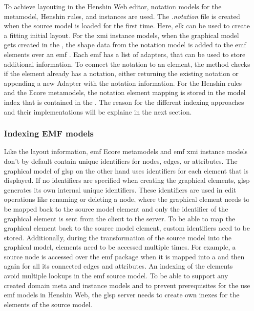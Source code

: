   To achieve layouting in the Henshin Web editor, notation models for the metamodel, Henshin rules, and instances are used. The \textit{.notation} file is created when the source model is loaded for the first time. Here, \ac{elk} can be used to create a fitting initial layout. For the \ac{xmi} instance models, when the graphical model gets created in the , the shape data from the notation model is added to the \ac{emf} elements over an \ac{emf} . Each \ac{emf}  has a list of adapters, that can be used to store additional information. \cite{emf} To connect the notation to an element, the  method checks if the element already has a notation, either returning the existing notation or appending a new Adapter with the notation information.
  For the Henshin rules and the Ecore metamodels, the notation element mapping is stored in the model index that is contained in the . The reason for the different indexing approaches and their implementations will be explaine in the next section. 


  \subsubsection{Indexing EMF models}
  \label{subsec:indexing}

  Like the layout information, \ac{emf} Ecore metamodels and \ac{emf} \ac{xmi} instance models don't by default contain unique identifiers for nodes, edges, or attributes. \cite{emf,emf-repo} The graphical model of \ac{glsp} on the other hand uses identifiers for each element that is displayed. If no identifiers are specified when creating the graphical elements, \ac{glsp} generates its own internal unique identifiers. These identifiers are used in edit operations like renaming or deleting a node, where the graphical element needs to be mapped back to the source model element and only the identifier of the graphical element is sent from the client to the server. To be able to map the graphical element back to the source model element, custom identifiers need to be stored. Additionally, during the transformation of the source model into the graphical model, elements need to be accessed multiple times. For example, a source node is accessed over the \ac{emf} package when it is mapped into a  and then again for all its connected edges and attributes. An indexing of the elements avoid multiple lookups in the \ac{emf} source model. To be able to support any created domain meta and instance models and to prevent prerequisites for the use \ac{emf} models in Henshin Web, the \ac{glsp} server needs to create own inexes for the elements of the source model. 

